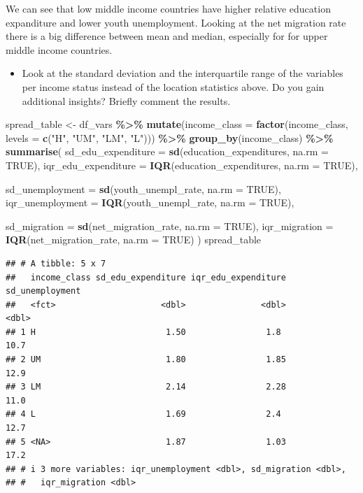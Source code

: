 \documentclass[
]{article}
\newenvironment{Shaded}{\begin{snugshade}}{\end{snugshade}}
\newcommand{\AttributeTok}[1]{\textcolor[rgb]{0.13,0.29,0.53}{#1}}
\newcommand{\ConstantTok}[1]{\textcolor[rgb]{0.56,0.35,0.01}{#1}}
\newcommand{\FunctionTok}[1]{\textcolor[rgb]{0.13,0.29,0.53}{\textbf{#1}}}
\newcommand{\NormalTok}[1]{#1}
\newcommand{\OtherTok}[1]{\textcolor[rgb]{0.56,0.35,0.01}{#1}}
\newcommand{\SpecialCharTok}[1]{\textcolor[rgb]{0.81,0.36,0.00}{\textbf{#1}}}
\newcommand{\StringTok}[1]{\textcolor[rgb]{0.31,0.60,0.02}{#1}}
\providecommand{\tightlist}{%
  \setlength{\itemsep}{0pt}\setlength{\parskip}{0pt}}
\begin{document}
We can see that low middle income countries have higher relative
education expanditure and lower youth unemployment. Looking at the net
migration rate there is a big difference between mean and median,
especially for for upper middle income countries.

\begin{itemize}
\tightlist
\item
  Look at the standard deviation and the interquartile range of the
  variables per income status instead of the location statistics above.
  Do you gain additional insights? Briefly comment the results.
\end{itemize}

\begin{Shaded}
\begin{Highlighting}[]
\NormalTok{spread\_table }\OtherTok{\textless{}{-}}\NormalTok{ df\_vars }\SpecialCharTok{\%\textgreater{}\%}
  \FunctionTok{mutate}\NormalTok{(}\AttributeTok{income\_class =} \FunctionTok{factor}\NormalTok{(income\_class, }\AttributeTok{levels =} \FunctionTok{c}\NormalTok{(}\StringTok{"H"}\NormalTok{, }\StringTok{"UM"}\NormalTok{, }\StringTok{"LM"}\NormalTok{, }\StringTok{"L"}\NormalTok{))) }\SpecialCharTok{\%\textgreater{}\%}
  \FunctionTok{group\_by}\NormalTok{(income\_class) }\SpecialCharTok{\%\textgreater{}\%}
  \FunctionTok{summarise}\NormalTok{(}
    \AttributeTok{sd\_edu\_expenditure =} \FunctionTok{sd}\NormalTok{(education\_expenditures, }\AttributeTok{na.rm =} \ConstantTok{TRUE}\NormalTok{),}
    \AttributeTok{iqr\_edu\_expenditure =} \FunctionTok{IQR}\NormalTok{(education\_expenditures, }\AttributeTok{na.rm =} \ConstantTok{TRUE}\NormalTok{),}
    
    \AttributeTok{sd\_unemployment =} \FunctionTok{sd}\NormalTok{(youth\_unempl\_rate, }\AttributeTok{na.rm =} \ConstantTok{TRUE}\NormalTok{),}
    \AttributeTok{iqr\_unemployment =} \FunctionTok{IQR}\NormalTok{(youth\_unempl\_rate, }\AttributeTok{na.rm =} \ConstantTok{TRUE}\NormalTok{),}
    
    \AttributeTok{sd\_migration =} \FunctionTok{sd}\NormalTok{(net\_migration\_rate, }\AttributeTok{na.rm =} \ConstantTok{TRUE}\NormalTok{),}
    \AttributeTok{iqr\_migration =} \FunctionTok{IQR}\NormalTok{(net\_migration\_rate, }\AttributeTok{na.rm =} \ConstantTok{TRUE}\NormalTok{)}
\NormalTok{  )}
\NormalTok{spread\_table}
\end{Highlighting}
\end{Shaded}

\begin{verbatim}
## # A tibble: 5 x 7
##   income_class sd_edu_expenditure iqr_edu_expenditure sd_unemployment
##   <fct>                     <dbl>               <dbl>           <dbl>
## 1 H                          1.50                1.8             10.7
## 2 UM                         1.80                1.85            12.9
## 3 LM                         2.14                2.28            11.0
## 4 L                          1.69                2.4             12.7
## 5 <NA>                       1.87                1.03            17.2
## # i 3 more variables: iqr_unemployment <dbl>, sd_migration <dbl>,
## #   iqr_migration <dbl>
\end{verbatim}
\end{document}
